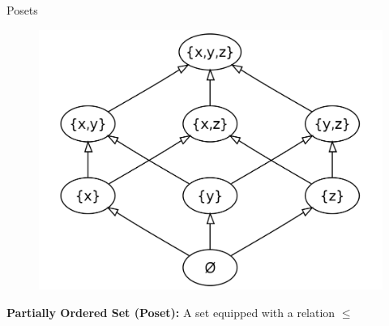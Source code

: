 \documentclass[xcolor=x11names,compress,t]{beamer}
\begin{document}

    

\begin{frame}{Posets}
    \begin{figure}[htp]
        \centering
        \includegraphics[scale = 0.14]{poset2.png}
    \end{figure}
    
    \textbf{Partially Ordered Set (Poset):} A set equipped with a relation $\leq$
\end{frame}
\end{document}

